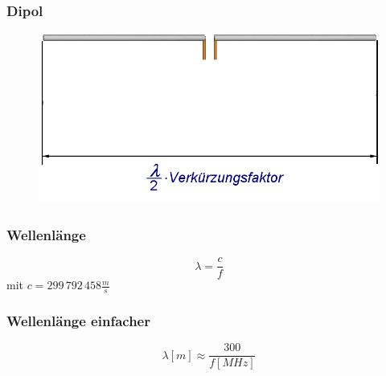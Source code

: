 \begin{frame}
  \frametitle{Dipol}
  \begin{center}
    \begin{figure}
      \includegraphics[width=1\textwidth,height=.75\textheight,keepaspectratio]{e11/Faltdipol.png}
    \end{figure}
  \end{center}
\end{frame}


\begin{frame}
  \frametitle{Wellenlänge}
  \begin{center} \huge
    $$\lambda = \frac{c}{f}$$
    mit $c = 299\,792\,458 \frac{m}{s}$
  \end{center}
\end{frame}

\begin{frame}
  \frametitle{Wellenlänge einfacher}
  \begin{center} \huge
    $$\lambda [m] \approx \frac{300}{f[MHz]}$$
  \end{center}
\end{frame}



